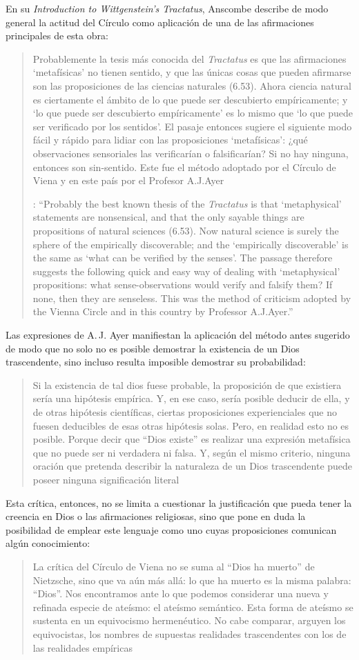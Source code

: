 En su \emph{Introduction to Wittgenstein's Tractatus}, Anscombe describe de modo general la actitud del Círculo como aplicación de una de las afirmaciones principales de esta obra: \blockquote[{\cite[150]{anscombe1959iwt}}: \enquote{Probably the best known thesis of the \emph{Tractatus} is that `metaphysical' statements are nonsensical, and that the only sayable things are propositions of natural sciences (6.53). Now natural science is surely the sphere of the empirically discoverable; and the `empirically discoverable' is the same as `what can be verified by the senses'. The passage therefore suggests the following quick and easy way of dealing with `metaphysical' propositions: what sense-observations would verify and falsify them? If none, then they are senseless. This was the method of criticism adopted by the Vienna Circle and in this country by Professor A.J.Ayer.}]{Probablemente la tesis más conocida del \emph{Tractatus} es que las afirmaciones `metafísicas' no tienen sentido, y que las únicas cosas que pueden afirmarse son las proposiciones de las ciencias naturales (6.53). Ahora ciencia natural es ciertamente el ámbito de lo que puede ser descubierto empíricamente; y `lo que puede ser descubierto empíricamente' es lo mismo que `lo que puede ser verificado por los sentidos'. El pasaje entonces sugiere el siguiente modo fácil y rápido para lidiar con las proposiciones `metafísicas': ¿qué observaciones sensoriales las verificarían o falsificarían? Si no hay ninguna, entonces son sin-sentido. Este fue el método adoptado por el Círculo de Viena y en este país por el Profesor A.J.Ayer}.

Las expresiones de A.\,J. Ayer manifiestan la aplicación del método antes sugerido de modo que no solo no es posible demostrar la existencia de un Dios trascendente, sino incluso resulta imposible demostrar su probabilidad: \blockquote[{\cite[Cf.~][155]{dominguez2009at}}]{Si la existencia de tal dios fuese probable, la proposición de que existiera sería una hipótesis empírica. Y, en ese caso, sería posible deducir de ella, y de otras hipótesis científicas, ciertas proposiciones experienciales que no fuesen deducibles de esas otras hipótesis solas. Pero, en realidad esto no es posible. \textelp{} Porque decir que ``Dios existe'' es realizar una expresión metafísica que no puede ser ni verdadera ni falsa. Y, según el mismo criterio, ninguna oración que pretenda describir la naturaleza de un Dios trascendente puede poseer ninguna significación literal}. Esta crítica, entonces, no se limita a cuestionar la justificación que pueda tener la creencia en Dios o las afirmaciones religiosas, sino que pone en duda la posibilidad de emplear este lenguaje como uno cuyas proposiciones comunican algún conocimiento: \blockquote[{\cite[155]{dominguez2009at}}]{La crítica del Círculo de Viena no se suma al ``Dios ha muerto'' de Nietzsche, sino que va aún más allá: lo que ha muerto es la misma palabra: ``Dios''. Nos encontramos ante lo que podemos considerar una nueva y refinada especie de ateísmo: el ateísmo semántico. Esta forma de ateísmo se sustenta en un equivocismo hermenéutico. No cabe comparar, arguyen los equivocistas, los nombres de supuestas realidades trascendentes con los de las realidades empíricas}.


